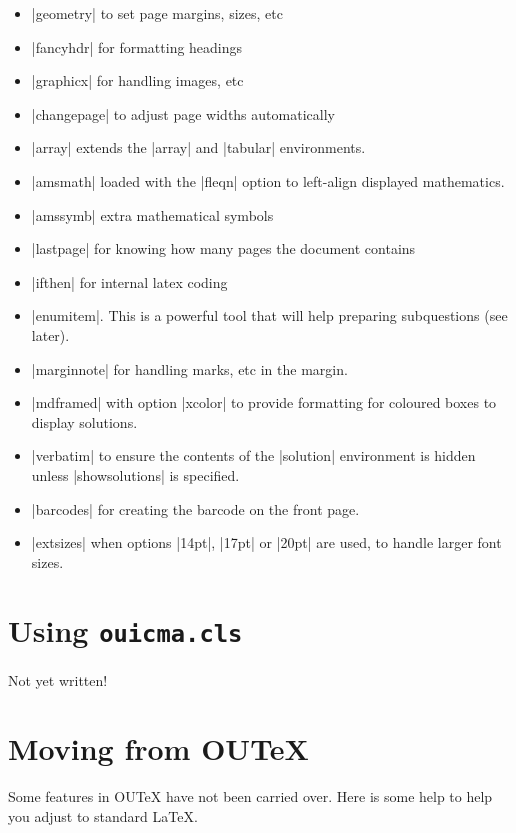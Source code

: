 \documentclass[a4paper]{ltxguide}
\newcommand\3{\unskip\enspace\fbox{\fontsize{4}{4}\selectfont NEW 3.0}}
\begin{document}
\begin{itemize}
\item |geometry| to set page margins, sizes, etc
\item |fancyhdr| for formatting headings
\item |graphicx| for handling images, etc
\item |changepage| to adjust page widths automatically
\item |array| extends the |array| and |tabular| environments.
\item |amsmath| loaded with the |fleqn| option to left-align displayed mathematics.
\item |amssymb| extra mathematical symbols
\item |lastpage| for knowing how many pages the document contains
\item |ifthen| for internal latex coding
\item |enumitem|. This is a powerful tool that will help preparing subquestions (see later).
\item |marginnote| for handling marks, etc in the margin.
\item |mdframed| with option |xcolor| to provide formatting for coloured boxes to display solutions.
\item |verbatim| to ensure the contents of the |solution| environment is hidden unless |showsolutions| is specified.
\item |barcodes| for creating the barcode on the front page. 
\item |extsizes| when options |14pt|, |17pt| or |20pt| are used, to handle larger font sizes. 
\end{itemize}

%
%
%
%
%
%
%
%
%
%
\section{Using \texttt{ouicma.cls}}
Not yet written!

%
%
%
%
%
%
%
%
%
%
\pagebreak
\section{Moving from OUTeX}

Some features in OUTeX have not been carried over. Here is some help to help you adjust to standard \LaTeX.
\end{document}
